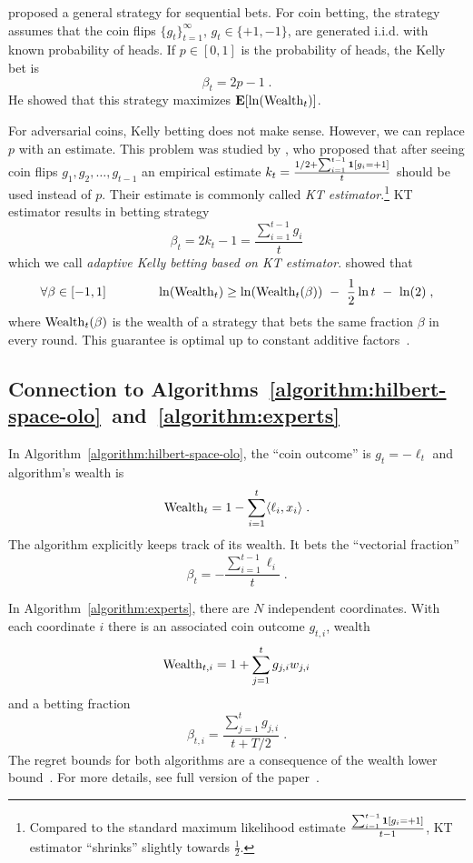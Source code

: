 \citet{Kelly-1956} proposed a general strategy for sequential bets. For coin
betting, the strategy assumes that the coin flips $\{g_t\}_{t=1}^\infty$, $g_t
\in \{+1,-1\}$, are generated i.i.d. with known probability of heads. If $p \in
[0,1]$ is the probability of heads, the Kelly bet is
$$
\beta_t = 2p - 1 \; .
$$
He showed that this strategy maximizes $\operatorname*{\mathbf{E}}[\ln(\operatorname{Wealth}_t)]$.

For adversarial coins, Kelly betting does not make sense. However, we can
replace $p$ with an estimate. This problem was studied by
\citet{Krichevsky-Trofimov-1981}, who proposed that after seeing coin flips
$g_1, g_2, \dots, g_{t-1}$ an empirical estimate $k_t = \frac{1/2 +
\sum_{i=1}^{t-1} \mathbf{1}[g_i = +1]}{t}$ should be used instead of $p$. Their
estimate is commonly called \emph{KT estimator}.\footnote{Compared to the
standard maximum likelihood estimate $\frac{\sum_{i=1}^{t-1} \mathbf{1}[g_i =
+1]}{t-1}$, KT estimator ``shrinks'' slightly towards $\frac{1}{2}$.} KT
estimator results in betting strategy
\begin{equation}
\label{equation:kt-estimator-betting-strategy}
\beta_t = 2k_t - 1 = \frac{\sum_{i=1}^{t-1} g_i}{t}
\end{equation}
which we call \emph{adaptive Kelly betting based on KT estimator}.
\citeauthor{Krichevsky-Trofimov-1981} showed that
\begin{equation}
\label{equation:wealth-lower-bound}
\forall \beta \in [-1,1] \qquad \qquad \ln(\operatorname{Wealth}_t) \ge \ln(\operatorname{Wealth}_t(\beta)) \ - \ \frac{1}{2} \ln t \ - \ \ln(2) \; ,
\end{equation}
where $\operatorname{Wealth}_t(\beta)$ is the wealth of a strategy that bets the same
fraction $\beta$ in every round. This guarantee is optimal up to constant
additive factors~\citep{Cesa-Bianchi-Lugosi-2006}.

\subsection{Connection to Algorithms~\ref{algorithm:hilbert-space-olo}~and~\ref{algorithm:experts}}
\label{subsection:connection}

In Algorithm~\ref{algorithm:hilbert-space-olo}, the ``coin outcome'' is
$g_t = -\ell_t$ and algorithm's wealth is
$$
\operatorname{Wealth}_t = 1 - \sum_{i=1}^t \langle \ell_i, x_i \rangle \; .
$$
The algorithm explicitly keeps track of its wealth. It bets the ``vectorial fraction''
$$
\beta_t = - \frac{\sum_{i=1}^{t-1} \ell_i}{t} \; .
$$

In Algorithm~\ref{algorithm:experts}, there are $N$ independent coordinates.
With each coordinate $i$ there is an associated coin outcome $g_{t,i}$, wealth
$$
\operatorname{Wealth}_{t,i} = 1 + \sum_{j=1}^t g_{j,i} w_{j,i}
$$
and a betting fraction
$$
\beta_{t,i} = \frac{\sum_{j=1}^t g_{j,i}}{t + T/2} \; .
$$
The regret bounds for both algorithms are a consequence of the wealth lower
bound~\label{equation:wealth-lower-bound}.  For more details, see full version
of the paper~\citep{Orabona-Pal-2016-parameter-free}.

